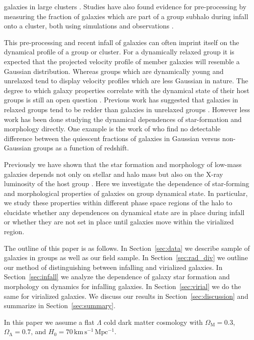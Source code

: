 \documentclass[a4paper,fleqn,usenatbib]{mnras}
\begin{document}
galaxies in large clusters \citep{kodama2001, helsdon2003, moran2007,
  wilman2009}.  Studies
have also found evidence for pre-processing by measuring the fraction
of galaxies which are part of a group subhalo during infall onto a cluster,
both using simulations \citep{mcgee2009, delucia2012, bahe2013} and
observations \citep{dressler2013, hou2014}.
\par
This pre-processing and recent infall of galaxies can often imprint
itself on the dynamical profile of a group or cluster.  For a
dynamically relaxed group it is expected that the projected velocity profile of member
galaxies will resemble a Gaussian distribution.  Whereas groups which
are dynamically young and unrelaxed tend to display velocity
profiles which are less Gaussian in nature.  The degree to which
galaxy properties correlate with the dynamical state of their host
groups is still an open question \citep[e.g.][]{biviano2002,
  ribeiro2013b}.  Previous work has suggested that 
galaxies in relaxed groups tend to be redder than galaxies in
unrelaxed groups \citep{ribeiro2010, carollo2013, ribeiro2013}.
However less work has been done studying the dynamical dependences of
star-formation and morphology directly.  One example is the work of
\citet{hou2013} who find no detectable difference between the
quiescent fractions
of galaxies in Gaussian versus non-Gaussian groups as a function of redshift.
\par
Previously we have shown that the star formation and morphology of
low-mass galaxies depends not only on stellar and halo mass but also
on the X-ray luminosity of the host group \citep{roberts2016}.  Here
we investigate the dependence of star-forming and 
morphological properties of galaxies on group dynamical state.  In
particular, we study these properties within different phase space regions
of the halo to elucidate whether any dependences on dynamical state
are in place during infall or whether they are not set in place until
galaxies move within the virialized region.
\par
The outline of this paper is as follows.  In Section~\ref{sec:data} we
describe sample of galaxies in groups as well as our field sample.  In
Section~\ref{sec:rad_div} we outline our method of distinguishing
between infalling and virialized galaxies.  In
Section~\ref{sec:infall} we analyze the dependence of galaxy star
formation and morphology on dynamics for infalling galaxies.  In
Section~\ref{sec:virial} we do the same for virialized galaxies.  We
discuss our results in Section~\ref{sec:discussion} and summarize in
Section~\ref{sec:summary}.
\par
In this paper we assume a flat $\Lambda$ cold dark matter cosmology
with $\Omega_\mathrm{M} = 0.3$, $\Omega_\mathrm{\Lambda} = 0.7$, and
$H_0 = 70\,\mathrm{km}\,\mathrm{s^{-1}}\,\mathrm{Mpc^{-1}}$.
\end{document}
